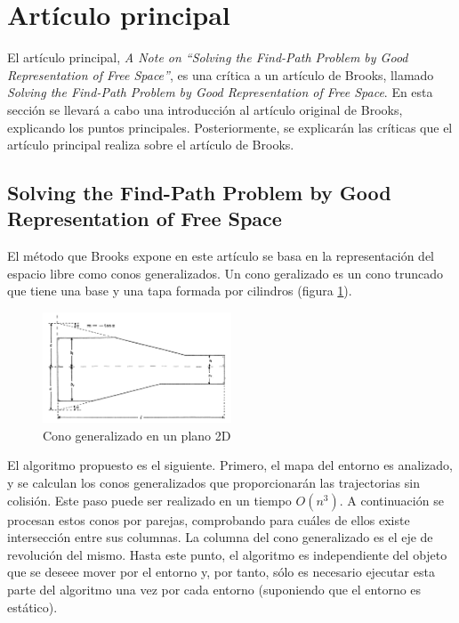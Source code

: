 \section{Artículo principal}
\label{articulo_principal}

El artículo principal, \textit{A Note on ``Solving the Find-Path Problem by Good Representation of Free Space''}, es una crítica a un artículo de Brooks, llamado \textit{Solving the Find-Path Problem by Good Representation of Free Space}. En esta sección se llevará a cabo una introducción al artículo original de Brooks, explicando los puntos principales. Posteriormente, se explicarán las críticas que el artículo principal realiza sobre el artículo de Brooks.

\subsection{Solving the Find-Path Problem by Good Representation of Free Space}

El método que Brooks expone en este artículo se basa en la representación del espacio libre como conos generalizados. Un cono geralizado es un cono truncado que tiene una base y una tapa formada por cilindros (figura \ref{fig:cono_generalizado}).\\

\begin{figure}[h]
		\centering
        \includegraphics[width=0.5\textwidth]{images/cono_gen.png}
        \caption{Cono generalizado en un plano 2D}
        \label{fig:cono_generalizado}
\end{figure} 

El algoritmo propuesto es el siguiente. Primero, el mapa del entorno es analizado, y se calculan los conos generalizados que proporcionarán las trajectorias sin colisión. Este paso puede ser realizado en un tiempo $O(n^3)$. A continuación se procesan estos conos por parejas, comprobando para cuáles de ellos existe intersección entre sus columnas. La columna del cono generalizado es el eje de revolución del mismo. Hasta este punto, el algoritmo es independiente del objeto que se deseee mover por el entorno y, por tanto, sólo es necesario ejecutar esta parte del algoritmo una vez por cada entorno (suponiendo que el entorno es estático).\\


